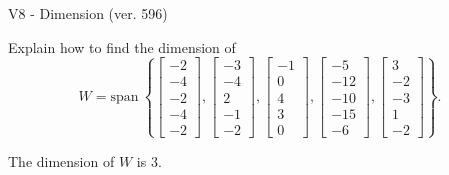 \begin{exercise}
  \begin{exerciseTitle}V8 - Dimension (ver. 596)\end{exerciseTitle}
  \begin{exerciseStatement}
    Explain how to find the dimension of 
\[W=\mathrm{span}\ \left\{\left[\begin{array}{r}
-2 \\
-4 \\
-2 \\
-4 \\
-2
\end{array}\right] , \left[\begin{array}{r}
-3 \\
-4 \\
2 \\
-1 \\
-2
\end{array}\right] , \left[\begin{array}{r}
-1 \\
0 \\
4 \\
3 \\
0
\end{array}\right] , \left[\begin{array}{r}
-5 \\
-12 \\
-10 \\
-15 \\
-6
\end{array}\right] , \left[\begin{array}{r}
3 \\
-2 \\
-3 \\
1 \\
-2
\end{array}\right]\right\}.\]



  \end{exerciseStatement}
  \begin{exerciseAnswer}
   The dimension of \(W\) is  \(3\).
  


  \end{exerciseAnswer}
\end{exercise}
